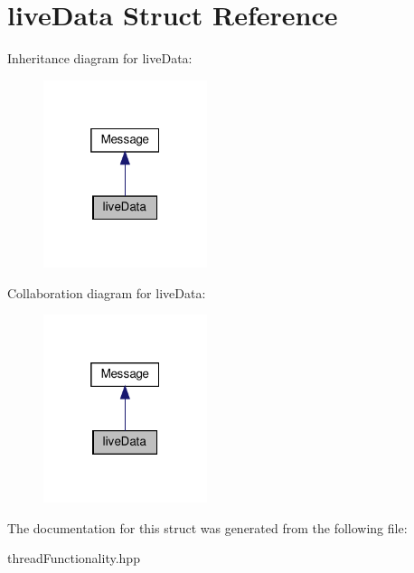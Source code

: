 \hypertarget{structliveData}{}\section{live\+Data Struct Reference}
\label{structliveData}


Inheritance diagram for live\+Data\+:\nopagebreak
\begin{figure}[H]
\begin{center}
\leavevmode
\includegraphics[width=136pt]{structliveData__inherit__graph}
\end{center}
\end{figure}


Collaboration diagram for live\+Data\+:\nopagebreak
\begin{figure}[H]
\begin{center}
\leavevmode
\includegraphics[width=136pt]{structliveData__coll__graph}
\end{center}
\end{figure}


The documentation for this struct was generated from the following file\+:\begin{DoxyCompactItemize}
\item 
thread\+Functionality.\+hpp\end{DoxyCompactItemize}
